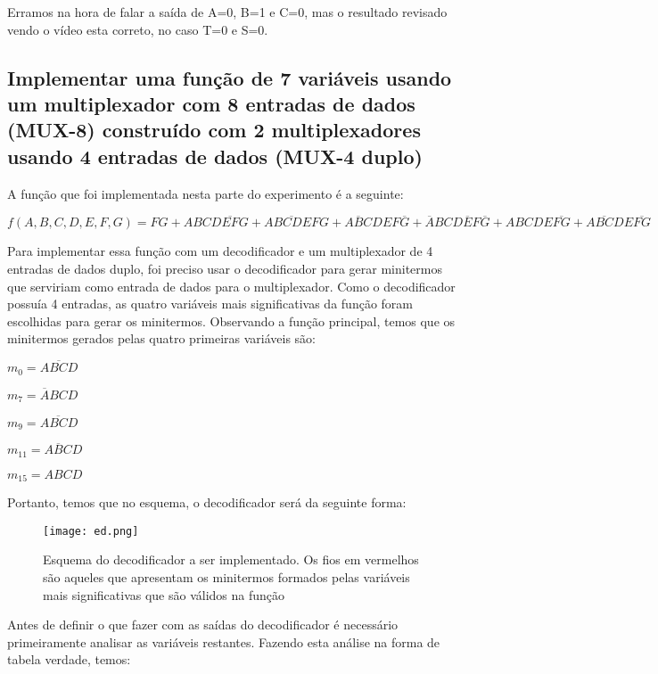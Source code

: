 \documentclass[12pt]{article}
\begin{document}
Erramos na hora de falar a saída de A=0, B=1 e C=0, mas o resultado revisado vendo o vídeo esta correto, no caso T=0 e S=0.

\subsection{Implementar uma função de 7 variáveis usando um multiplexador com 8 entradas de dados (MUX-8) construído com 2 multiplexadores usando 4 entradas de dados (MUX-4 duplo)}
\label{sec:Demux}

A função que foi implementada nesta parte do experimento é a seguinte:

$f(A,B,C,D,E,F,G) = FG + ABCD\overline{EF}G + \overline{ABCDEF}G + A\overline{B}CDEF\overline{G} + \overline{A}BCD\overline{E}F\overline{G} + ABCDE\overline{FG} + A\overline{BC}DE\overline{FG}$

Para implementar essa função com um decodificador e um multiplexador de 4 entradas de dados duplo, foi preciso usar o decodificador para gerar minitermos que serviriam como entrada de dados para o multiplexador. Como o decodificador possuía 4 entradas, as quatro variáveis mais significativas da função foram escolhidas para gerar os minitermos. Observando a função principal, temos que os minitermos gerados pelas quatro primeiras variáveis são:

$m_{0}=\overline{ABCD}$

$m_{7}=\overline{A}BCD$

$m_{9}=A\overline{BC}D$

$m_{11}=A\overline{B}CD$

$m_{15}=ABCD$

Portanto, temos que no esquema, o decodificador será da seguinte forma: 

\begin{figure}[H]
	\centering
	\texttt{[image: ed.png]}
	\caption{Esquema do decodificador a ser implementado. Os fios em vermelhos são aqueles que apresentam os minitermos formados pelas variáveis mais significativas  que são válidos na função}
	\label{fig:edd}
\end{figure}

Antes de definir o que fazer com as saídas do decodificador é necessário primeiramente analisar as variáveis restantes. Fazendo esta análise na forma de tabela verdade, temos:
\end{document}
